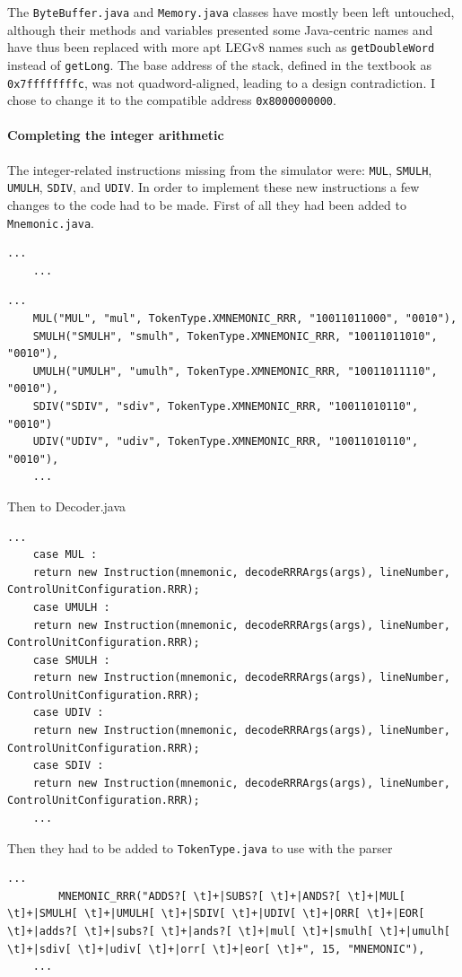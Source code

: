 The \verb|ByteBuffer.java| and \verb|Memory.java| classes have mostly been left untouched, although their methods and variables presented some Java-centric names and have thus been replaced with more apt LEGv8 names such as \verb|getDoubleWord| instead of \verb|getLong|. The base address of the stack, defined in the textbook as \verb|0x7ffffffffc|,  was not quadword-aligned, leading to a design contradiction. I chose to change it to the  compatible address \verb|0x8000000000|.

\paragraph{Completing the integer arithmetic}

The integer-related instructions missing from the simulator were: \verb|MUL|, \verb|SMULH|, \verb|UMULH|, \verb|SDIV|, and \verb|UDIV|. In order to implement these new instructions a few changes to the code had to be made. First of all they had been added to \verb|Mnemonic.java|.
\begin{lstlisting}[caption={}]
	...
	...
\end{lstlisting}
\begin{lstlisting}[caption={Added mnemonics}]
	...
	MUL("MUL", "mul", TokenType.XMNEMONIC_RRR, "10011011000", "0010"),
	SMULH("SMULH", "smulh", TokenType.XMNEMONIC_RRR, "10011011010", "0010"),
	UMULH("UMULH", "umulh", TokenType.XMNEMONIC_RRR, "10011011110", "0010"),
	SDIV("SDIV", "sdiv", TokenType.XMNEMONIC_RRR, "10011010110", "0010")
	UDIV("UDIV", "udiv", TokenType.XMNEMONIC_RRR, "10011010110", "0010"),
	...
\end{lstlisting}
Then to Decoder.java
\begin{lstlisting}[caption={Added instructions to the decoder}]
	...
	case MUL :
	return new Instruction(mnemonic, decodeRRRArgs(args), lineNumber, ControlUnitConfiguration.RRR);
	case UMULH :
	return new Instruction(mnemonic, decodeRRRArgs(args), lineNumber, ControlUnitConfiguration.RRR);
	case SMULH :
	return new Instruction(mnemonic, decodeRRRArgs(args), lineNumber, ControlUnitConfiguration.RRR);
	case UDIV :
	return new Instruction(mnemonic, decodeRRRArgs(args), lineNumber, ControlUnitConfiguration.RRR);
	case SDIV :
	return new Instruction(mnemonic, decodeRRRArgs(args), lineNumber, ControlUnitConfiguration.RRR);
	...
\end{lstlisting}
Then they had to be added to \verb|TokenType.java| to use with the parser
\begin{lstlisting}[caption={Addition to the parser}]
	...
		MNEMONIC_RRR("ADDS?[ \t]+|SUBS?[ \t]+|ANDS?[ \t]+|MUL[ \t]+|SMULH[ \t]+|UMULH[ \t]+|SDIV[ \t]+|UDIV[ \t]+|ORR[ \t]+|EOR[ \t]+|adds?[ \t]+|subs?[ \t]+|ands?[ \t]+|mul[ \t]+|smulh[ \t]+|umulh[ \t]+|sdiv[ \t]+|udiv[ \t]+|orr[ \t]+|eor[ \t]+", 15, "MNEMONIC"),
	...
\end{lstlisting}
